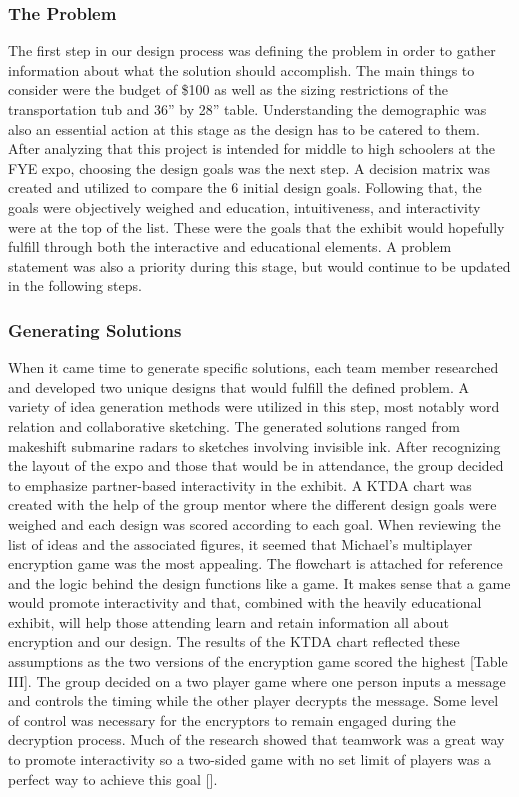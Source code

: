\documentclass[conference]{IEEEtran}
\begin{document}
\subsubsection{The Problem}

The first step in our design process was defining the problem in order to gather information about what the solution should accomplish. The main things to consider were the budget of \$100 as well as the sizing restrictions of the transportation tub and 36” by 28” table. Understanding the demographic was also an essential action at this stage as the design has to be catered to them. After analyzing that this project is intended for middle to high schoolers at the FYE expo, choosing the design goals was the next step. A decision matrix was created and utilized to compare the 6 initial design goals. Following that, the goals were objectively weighed and education, intuitiveness, and interactivity were at the top of the list. These were the goals that the exhibit would hopefully fulfill through both the interactive and educational elements. A problem statement was also a priority during this stage, but would continue to be updated in the following steps. 

\subsubsection{Generating Solutions}

\par When it came time to generate specific solutions, each team member researched and developed two unique designs that would fulfill the defined problem. A variety of idea generation methods were utilized in this step, most notably word relation and collaborative sketching. The generated solutions ranged from makeshift submarine radars to sketches involving invisible ink. After recognizing the layout of the expo and those that would be in attendance, the group decided to emphasize partner-based interactivity in the exhibit. A KTDA chart was created with the help of the group mentor where the different design goals were weighed and each design was scored according to each goal. When reviewing the list of ideas and the associated figures,  it seemed that Michael’s multiplayer encryption game was the most appealing. The flowchart is attached for reference and the logic behind the design functions like a game. It makes sense that a game would promote interactivity and that, combined with the heavily educational exhibit, will help those attending learn and retain information all about encryption and our design. The results of the KTDA chart reflected these assumptions as the two versions of the encryption game scored the highest [Table III]. The group decided on a two player game where one person inputs a message and controls the timing while the other player decrypts the message. Some level of control was necessary for the encryptors to remain engaged during the decryption process. Much of the research showed that teamwork was a great way to promote interactivity so a two-sided game with no set limit of players was a perfect way to achieve this goal [\cite{b25}].
\end{document}
